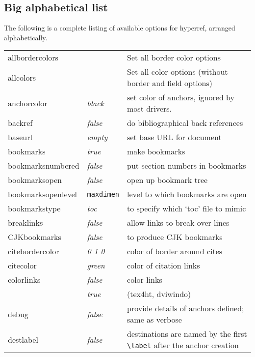 \documentclass{article}
\newcommand{\bs}{\symbol{'134}}%
\newcommand{\ci}[1]{\texttt{\bs#1}}
\begin{document}
\subsection{Big alphabetical list}

The following is a complete listing of available options for
\textsf{hyperref}, arranged alphabetically.

\begin{longtable}{@{}>{\ttfamily}llp{7cm}@{}}
allbordercolors    &                        & Set all border color options\\
allcolors          &                        & Set all color options (without border and field options)\\
anchorcolor        & \textit{black}         & set color of anchors, ignored by most drivers. \\
backref            & \textit{false}         & do bibliographical back references \\
baseurl            & \textit{empty}         & set base URL for document \\
bookmarks          & \textit{true}          & make bookmarks \\
bookmarksnumbered  & \textit{false}         & put section numbers in bookmarks \\
bookmarksopen      & \textit{false}         & open up bookmark tree \\
bookmarksopenlevel & \ttfamily\ci{maxdimen} & level to which bookmarks are open \\
bookmarkstype      & \textit{toc}           & to specify which `toc' file to mimic \\
breaklinks         & \textit{false}         & allow links to break over lines \\
CJKbookmarks       & \textit{false}         & to produce CJK bookmarks\\
citebordercolor    & \textit{0 1 0}         & color of border around cites \\
citecolor          & \textit{green}         & color of citation links \\
colorlinks         & \textit{false}         & color links \\
                   & \textit{true}          & (\textsf{tex4ht}, \textsf{dviwindo}) \\
debug              & \textit{false}         & provide details of anchors defined; same as verbose \\
destlabel          & \textit{false}         & destinations are named by the first \verb|\label| after the anchor creation \\

\end{longtable}
\end{document}
